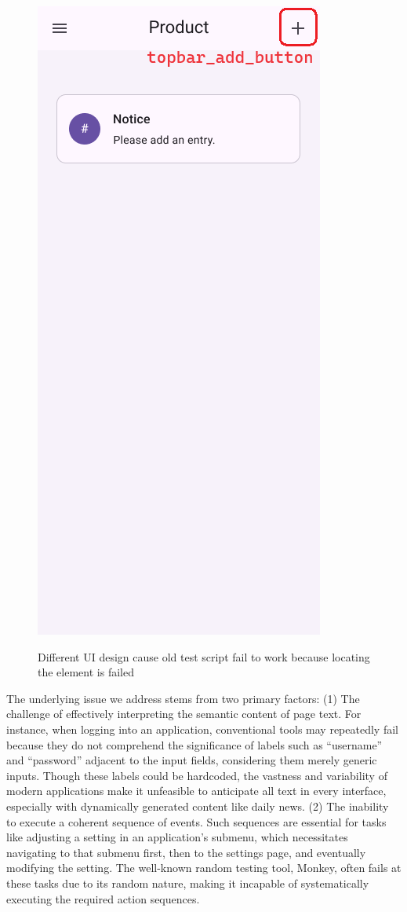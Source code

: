 \documentclass[conference]{IEEEtran}
\begin{document}
\begin{figure}[htbp]
{\includegraphics[scale=0.25]{assets/AppUI-TopBar-labeled.png} 
}
\caption{Different UI design cause old test script fail to work because locating the element is failed}
\label{image-ui-element-update}
\end{figure}

The underlying issue we address stems from two primary factors:
(1) The challenge of effectively interpreting the semantic content of page text. For instance, when logging into an application, conventional tools may repeatedly fail because they do not comprehend the significance of labels such as ``username'' and ``password'' adjacent to the input fields, considering them merely generic inputs. Though these labels could be hardcoded, the vastness and variability of modern applications make it unfeasible to anticipate all text in every interface, especially with dynamically generated content like daily news.
(2) The inability to execute a coherent sequence of events. Such sequences are essential for tasks like adjusting a setting in an application's submenu, which necessitates navigating to that submenu first, then to the settings page, and eventually modifying the setting. The well-known random testing tool, Monkey, often fails at these tasks due to its random nature, making it incapable of systematically executing the required action sequences.
\end{document}
